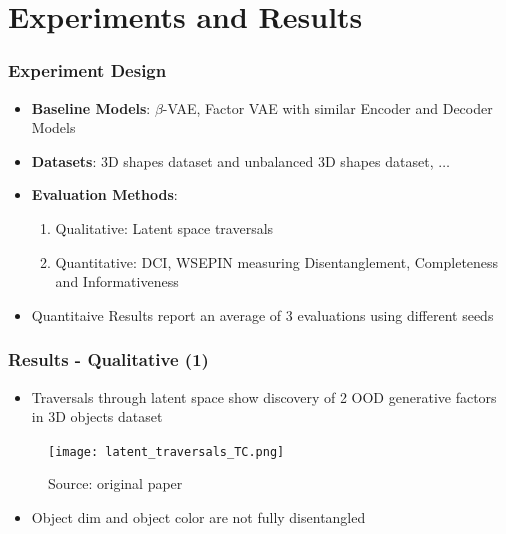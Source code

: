 \documentclass{beamer}
\theoremstyle{definition}
\begin{document}
  \section{Experiments and Results}
    \begin{frame}
      \frametitle{Experiment Design}
      \begin{itemize}
        \item \textbf{Baseline Models}: $\beta$-VAE, Factor VAE with similar Encoder and Decoder Models
        \item \textbf{Datasets}: 3D shapes dataset and unbalanced 3D shapes dataset, $\dots$
        \item \textbf{Evaluation Methods}:
          \begin{enumerate}
            \item Qualitative: Latent space traversals
            \item Quantitative: DCI, WSEPIN measuring Disentanglement, Completeness and Informativeness
          \end{enumerate}
        \item Quantitaive Results report an average of 3 evaluations using different seeds
      \end{itemize}
    \end{frame}

    \begin{frame}
      \frametitle{Results - Qualitative (1)}
      \begin{itemize}
        \item Traversals through latent space show discovery of 2 OOD generative factors in 3D objects dataset
      \end{itemize}
      \begin{figure}
        \centering
        \texttt{[image: latent\_traversals\_TC.png]}
        \captionsetup{justification=centering}
        \caption*{\tiny{Source: original paper}}
      \end{figure}
      \begin{itemize}
        \item Object dim and object color are not fully disentangled
      \end{itemize}
    \end{frame}
\end{document}

